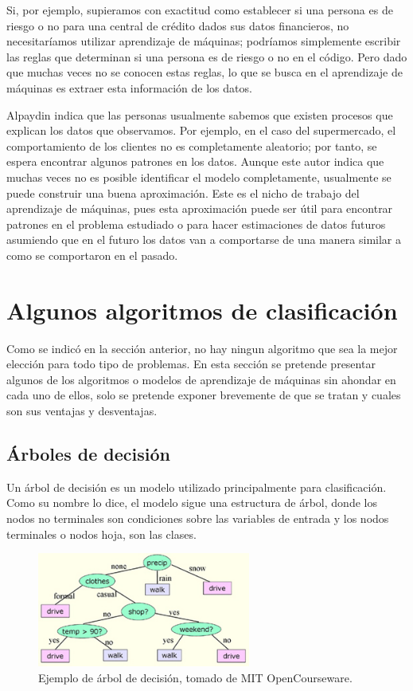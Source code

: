 \documentclass[a4paper, 11pt, oneside]{report}
\begin{document}
Si, por ejemplo, supieramos con exactitud como establecer si una persona es de riesgo o no para una central de crédito dados sus datos financieros, no necesitaríamos utilizar
aprendizaje de máquinas; podríamos simplemente escribir las reglas que determinan si una persona es de riesgo o no en el código. Pero dado que muchas veces no se conocen estas reglas, lo que se busca en el aprendizaje de máquinas es extraer esta información de los datos.

Alpaydin indica que las personas usualmente sabemos que existen procesos que explican los datos que observamos. Por ejemplo, en el caso del supermercado, el comportamiento de los clientes no es completamente aleatorio; por tanto, se espera encontrar algunos patrones en los datos. Aunque este autor indica que muchas veces no es posible identificar el modelo completamente, usualmente se puede construir una buena aproximación. Este es el nicho de trabajo del aprendizaje de máquinas, pues esta aproximación puede ser útil para encontrar patrones en el problema estudiado o para hacer estimaciones de datos futuros asumiendo que en el futuro los datos van a comportarse de una manera similar a como se comportaron en el pasado.

\section{Algunos algoritmos de clasificación}

Como se indicó en la sección anterior, no hay ningun algoritmo que sea la mejor elección para todo tipo de problemas. En esta sección se pretende presentar algunos de los algoritmos o modelos de aprendizaje de máquinas sin ahondar en cada uno de ellos, solo se pretende exponer brevemente de que se tratan y cuales son sus ventajas y desventajas.

\subsection{Árboles de decisión}

Un árbol de decisión es un modelo utilizado principalmente para clasificación. Como su nombre lo dice, el modelo sigue una estructura de árbol, donde los nodos no terminales son condiciones sobre las variables de entrada y los nodos terminales o nodos hoja, son las clases.

\begin{figure}[htb]
\begin{center}
\leavevmode
\includegraphics[width=7cm]{img/decisiontree.jpg}
\end{center}
\caption{Ejemplo de árbol de decisión, tomado de MIT OpenCourseware.}
\label{fig:decisionTree}
\end{figure}
\end{document}
